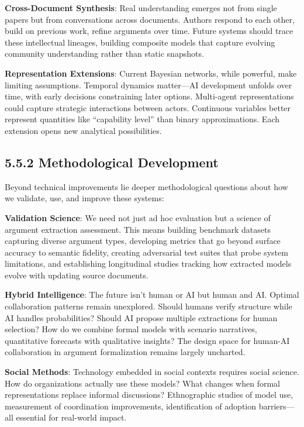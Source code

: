\documentclass[
  11pt,
  letterpaper,
  openany]{book}
\begin{document}
\textbf{Cross-Document Synthesis}: Real understanding emerges not from
single papers but from conversations across documents. Authors respond
to each other, build on previous work, refine arguments over time.
Future systems should trace these intellectual lineages, building
composite models that capture evolving community understanding rather
than static snapshots.

\textbf{Representation Extensions}: Current Bayesian networks, while
powerful, make limiting assumptions. Temporal dynamics matter---AI
development unfolds over time, with early decisions constraining later
options. Multi-agent representations could capture strategic
interactions between actors. Continuous variables better represent
quantities like ``capability level'' than binary approximations. Each
extension opens new analytical possibilities.

\subsection{5.5.2 Methodological
Development}\label{sec-methodological-development}

Beyond technical improvements lie deeper methodological questions about
how we validate, use, and improve these systems:

\textbf{Validation Science}: We need not just ad hoc evaluation but a
science of argument extraction assessment. This means building benchmark
datasets capturing diverse argument types, developing metrics that go
beyond surface accuracy to semantic fidelity, creating adversarial test
suites that probe system limitations, and establishing longitudinal
studies tracking how extracted models evolve with updating source
documents.

\textbf{Hybrid Intelligence}: The future isn't human or AI but human and
AI. Optimal collaboration patterns remain unexplored. Should humans
verify structure while AI handles probabilities? Should AI propose
multiple extractions for human selection? How do we combine formal
models with scenario narratives, quantitative forecasts with qualitative
insights? The design space for human-AI collaboration in argument
formalization remains largely uncharted.

\textbf{Social Methods}: Technology embedded in social contexts requires
social science. How do organizations actually use these models? What
changes when formal representations replace informal discussions?
Ethnographic studies of model use, measurement of coordination
improvements, identification of adoption barriers---all essential for
real-world impact.
\end{document}
